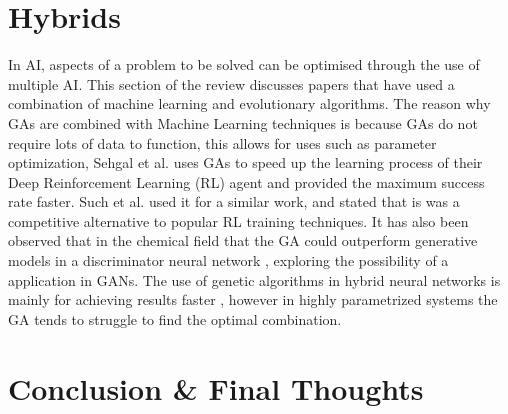 \documentclass{report}
\begin{document}
\section{Hybrids}
In AI, aspects of a problem to be solved can be optimised through the use of multiple AI. This section of the review discusses papers that have used a combination of machine learning and evolutionary algorithms. The reason why GAs are combined with Machine Learning techniques is because GAs do not require lots of data to function, this allows for uses such as parameter optimization, Sehgal et al.\cite{Sehgal2019} uses GAs to speed up the learning process of their Deep Reinforcement Learning (RL) agent and provided the maximum success rate faster. Such et al. \cite{Such2017} used it for a similar work, and stated that is was a competitive alternative to popular RL training techniques. It has also been observed that in the chemical field that the GA could outperform generative models in a discriminator neural network \cite{Nigam2019}, exploring the possibility of a application in GANs. The use of genetic algorithms in hybrid neural networks is mainly for achieving results faster \cite{Sehgal2019}\cite{Such2017}, however in highly parametrized systems the GA tends to struggle to find the optimal combination. \cite{Janikow1993}

\section{Conclusion \& Final Thoughts}



\end{document}
